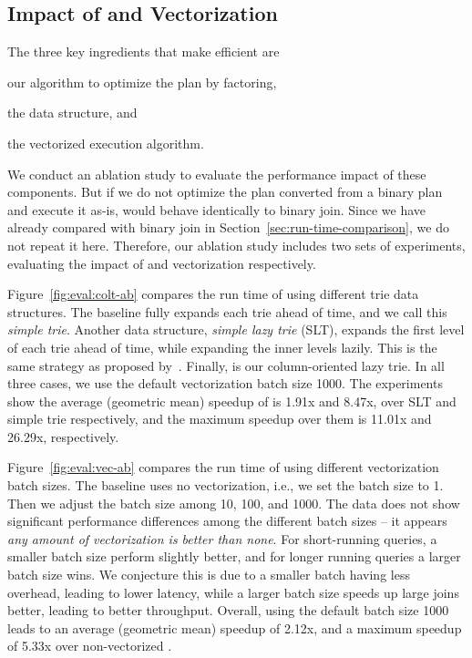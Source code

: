   \subsection{Impact of \COLT and Vectorization}
The three key ingredients that make \FJ efficient 
  are \begin{enumerate*}
    \item our algorithm to optimize the \FJ plan by factoring,
    \item the \COLT data structure, and
    \item the vectorized execution algorithm.
  \end{enumerate*}
We conduct an ablation study to evaluate the performance impact of these components. 
But if we do not optimize the \FJ plan converted from a binary plan 
  and execute it as-is, \FJ would behave identically to binary join.
Since we have already compared \FJ with binary join in Section~\ref{sec:run-time-comparison},
  we do not repeat it here.
Therefore, our ablation study includes two sets of experiments, 
  evaluating the impact of \COLT and vectorization respectively.



Figure~\ref{fig:eval:colt-ab} compares the run time of \FJ using different trie data structures.
The baseline fully expands each trie ahead of time, and we call this \emph{simple trie}.
Another data structure, \emph{simple lazy trie} (SLT), expands the first level of each trie 
  ahead of time, while expanding the inner levels lazily.
This is the same strategy as proposed by~\citet{DBLP:journals/pvldb/FreitagBSKN20}.
Finally, \COLT is our column-oriented lazy trie.
In all three cases, we use the default vectorization batch size 1000.
The experiments show the average (geometric mean) speedup of \COLT 
  is 1.91x and 8.47x, over SLT and simple trie respectively,
  and the maximum speedup over them is 11.01x and 26.29x, respectively.


Figure~\ref{fig:eval:vec-ab} compares the run time of \FJ using different vectorization batch sizes.
The baseline uses no vectorization, i.e., we set the batch size to 1.
Then we adjust the batch size among 10, 100, and 1000.
The data does not show significant performance differences among
  the different batch sizes -- 
  it appears \emph{any amount of vectorization is better than none}.
For short-running queries, a smaller batch size perform slightly better,
  and for longer running queries a larger batch size wins.
We conjecture this is due to a smaller batch having less overhead, 
  leading to lower latency, 
  while a larger batch size speeds up large joins better,
  leading to better throughput. 
Overall, using the default batch size 1000
  leads to an average (geometric mean) speedup of 2.12x, 
  and a maximum speedup of 5.33x over non-vectorized \FJ.


